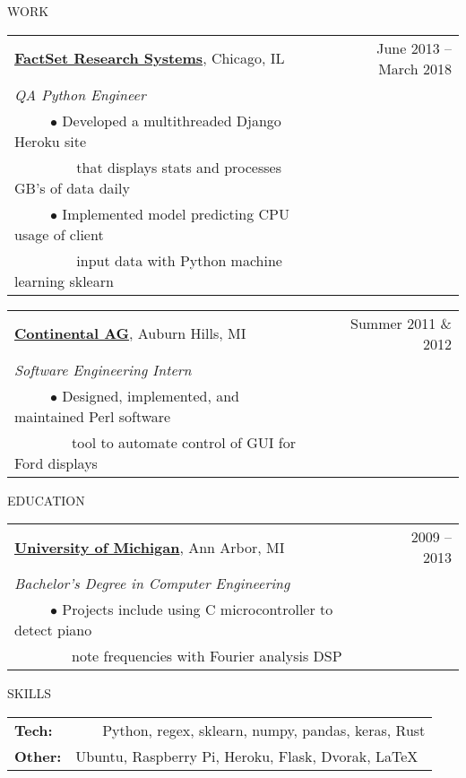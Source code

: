 \documentclass[12pt]{article}
\begin{document}
\vspace {.8cm}


{WORK}
\vspace{0.4cm}

\begin{tabularx}{\linewidth}{l X r}
\textbf{\href{https://www.factset.com/}{FactSet Research Systems}}, Chicago, IL & & June 2013 -- March 2018 \\
\emph{QA Python Engineer} \\
~~~~~$\bullet$ Developed a multithreaded Django Heroku site \\
~~~~~~~~  that displays stats and processes GB's of data daily\\
~~~~~$\bullet$ Implemented model predicting CPU usage of client \\
~~~~~~~~  input data with Python machine learning sklearn\\
\end{tabularx}

\vspace{0.4cm}

\begin{tabularx}{\linewidth}{l X r}
\textbf{\href{https://www.continental-corporation.com/en}{Continental AG}}, Auburn Hills, MI & & Summer 2011 \& 2012 \\
\emph{Software Engineering Intern} \\
~~~~~$\bullet$ Designed, implemented, and maintained Perl software \\
~~~~~~~~tool to automate control of GUI for Ford displays\\
\end{tabularx}

\vspace{.8cm}


{EDUCATION}
\vspace{0.4cm}

\begin{tabularx}{\linewidth}{l X r}
\textbf{\href{https://www.eecs.umich.edu/eecs/undergraduate/}{University of Michigan}}, Ann Arbor, MI & &  2009 -- 2013 \\
\emph{Bachelor's Degree in Computer Engineering} \\
~~~~~$\bullet$ Projects include using C microcontroller to detect piano \\
~~~~~~~~note frequencies with Fourier analysis DSP\\
\end{tabularx}

\vspace {0.8cm}


{SKILLS}
\vspace{0.4cm}

\begin{tabularx}{\linewidth}{X r}
\textbf{Tech:} & Python, regex, sklearn, numpy, pandas, keras, Rust \\
\textbf{Other:} & Ubuntu, Raspberry Pi, Heroku, Flask, Dvorak,  \LaTeX \
\end{tabularx}
\end{document}

